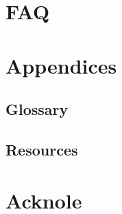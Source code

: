 \documentclass[a4paper,12pt]{article} %
\begin{document}
    \section{FAQ}


    \section{Appendices}

    \subsection{Glossary}

    \subsection{Resources}






    \section{}


    \section{Acknole}
\end{document}
